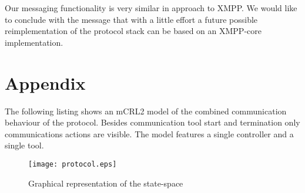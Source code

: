 \documentclass{article}
\begin{document}
   Our messaging functionality is very similar in approach to XMPP. We would
   like to conclude with the message that with a little effort a future
   possible reimplementation of the protocol stack can be based on an XMPP-core
   implementation.

  \enlargethispage*{4pt}
  

  \section{Appendix}
  \pagestyle{empty}

  The following listing shows an mCRL2 model of the combined communication
  behaviour of the protocol. Besides communication tool start and termination
  only communications actions are visible. The model features a single
  controller and a single tool.

  \small  \normalsize

  \begin{figure}[H]
   \texttt{[image: protocol.eps]}
   \caption{Graphical representation of the state-space}
  \end{figure}

   
   
\end{document}
